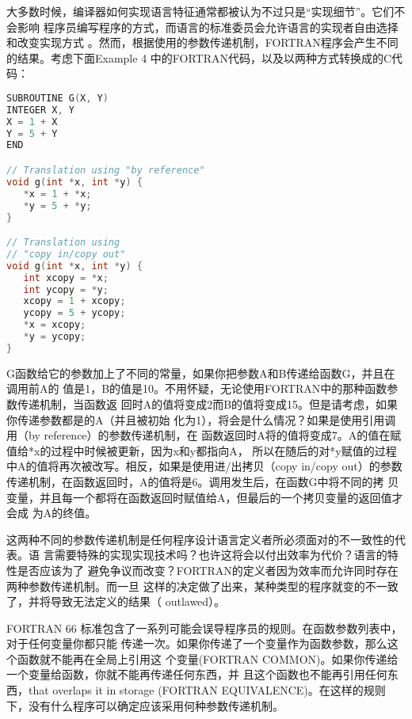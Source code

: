 \documentclass[a4paper,11pt]{book}
\begin{document}
大多数时候，编译器如何实现语言特征通常都被认为不过只是“实现细节”。它们不会影响
程序员编写程序的方式，而语言的标准委员会允许语言的实现者自由选择和改变实现方式
。然而，根据使用的参数传递机制，FORTRAN程序会产生不同的结果。考虑下面Example 4
中的FORTRAN代码，以及以两种方式转换成的C代码：

\begin{lstlisting}[language=c, caption='Example 4:']
SUBROUTINE G(X, Y)
INTEGER X, Y
X = 1 + X
Y = 5 + Y
END

// Translation using "by reference"
void g(int *x, int *y) {
   *x = 1 + *x;
   *y = 5 + *y;
}

// Translation using
// "copy in/copy out"
void g(int *x, int *y) {
   int xcopy = *x;
   int ycopy = *y;
   xcopy = 1 + xcopy;
   ycopy = 5 + ycopy;
   *x = xcopy;
   *y = ycopy;
}
\end{lstlisting}
G函数给它的参数加上了不同的常量，如果你把参数A和B传递给函数G，并且在调用前A的
值是1，B的值是10。不用怀疑，无论使用FORTRAN中的那种函数参数传递机制，当函数返
回时A的值将变成2而B的值将变成15。但是请考虑，如果你传递参数都是的A（并且被初始
化为1），将会是什么情况？如果是使用引用调用（by reference）的参数传递机制，在
函数返回时A将的值将变成7。A的值在赋值给*x的过程中时候被更新，因为x和y都指向A，
所以在随后的对*y赋值的过程中A的值将再次被改写。相反，如果是使用进/出拷贝（copy
in/copy out）的参数传递机制，在函数返回时，A的值将是6。调用发生后，在函数G中将不同的拷
贝变量，并且每一个都将在函数返回时赋值给A，但最后的一个拷贝变量的返回值才会成
为A的终值。

这两种不同的参数传递机制是任何程序设计语言定义者所必须面对的不一致性的代表。语
言需要特殊的实现实现技术吗？也许这将会以付出效率为代价？语言的特性是否应该为了
避免争议而改变？FORTRAN的定义者因为效率而允许同时存在两种参数传递机制。而一旦
这样的决定做了出来，某种类型的程序就变的不一致了，并将导致无法定义的结果（
outlawed）。

FORTRAN 66
标准包含了一系列可能会误导程序员的规则。在函数参数列表中，对于任何变量你都只能
传递一次。如果你传递了一个变量作为函数参数，那么这个函数就不能再在全局上引用这
个变量(FORTRAN COMMON)。如果你传递给一个变量给函数，你就不能再传递任何东西，并
且这个函数也不能再引用任何东西，that overlaps it in storage (FORTRAN
EQUIVALENCE)。在这样的规则下，没有什么程序可以确定应该采用何种参数传递机制。
\end{document}

